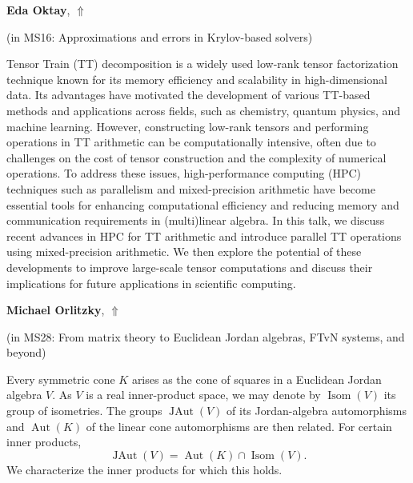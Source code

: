 \documentclass[ILAS2025-program.tex]{subfiles}
\begin{document}
\hypertarget{down0343}{}\begin{ilasabstract}
    
\textbf{Eda Oktay},  \hfill \hyperlink{up0343}{$\Uparrow$}
    
    
(in {\color{mstitle}MS16: Approximations and errors in Krylov-based solvers})
        
\mtskip
    Tensor Train (TT) decomposition is a widely used low-rank tensor factorization technique known for its memory efficiency and scalability in high-dimensional data. Its advantages have motivated the development of various TT-based methods and applications across fields, such as chemistry, quantum physics, and machine learning. However, constructing low-rank tensors and performing operations in TT arithmetic can be computationally intensive, often due to challenges on the cost of tensor construction and the complexity of numerical operations. To address these issues, high-performance computing (HPC) techniques such as parallelism and mixed-precision arithmetic have become essential tools for enhancing computational efficiency and reducing memory and communication requirements in (multi)linear algebra. In this talk, we discuss recent advances in HPC for TT arithmetic and introduce parallel TT operations using mixed-precision arithmetic. We then explore the potential of these developments to improve large-scale tensor computations and discuss their implications for future applications in scientific computing.
\end{ilasabstract}
    

\hypertarget{down0385}{}\begin{ilasabstract}
    
\textbf{Michael Orlitzky},  \hfill \hyperlink{up0385}{$\Uparrow$}
    
    
(in {\color{mstitle}MS28: From matrix theory to Euclidean Jordan algebras, FTvN systems, and beyond})
        
\mtskip
    Every symmetric cone $K$ arises as the cone of squares in a Euclidean
Jordan algebra $V$. As $V$ is a real inner-product space, we may
denote by $\operatorname{Isom}\left(V\right)$ its group of
isometries. The groups $\operatorname{JAut}\left(V\right)$ of its
Jordan-algebra automorphisms and $\operatorname{Aut}\left(K\right)$
of the linear cone automorphisms are then related. For certain inner
products,
%
\begin{equation*}
  \operatorname{JAut}\left(V\right)
  =
  \operatorname{Aut}\left(K\right)
  \cap
  \operatorname{Isom}\left(V\right).
\end{equation*}
%
We characterize the inner products for which this holds.

\end{ilasabstract}
    
\end{document}
